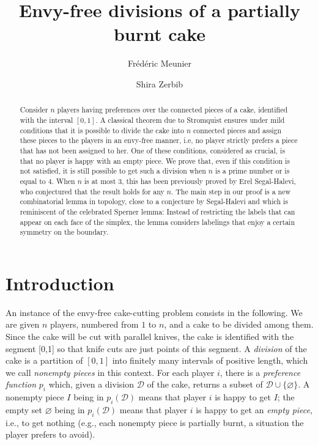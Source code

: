 \documentclass[12pt]{amsart}
\theoremstyle{definition}
\theoremstyle{remark}
\def\D{\mathcal{D}}
\begin{document}
 

\title{Envy-free divisions of a partially burnt cake}

\author{Fr\'ed\'eric Meunier}
\address{F. Meunier, Universit\'e Paris Est, CERMICS, 77455 Marne-la-Vall\'ee CEDEX, France}

\author{Shira Zerbib}
\address{S. Zerbib, Dept. Math., University of Michigan, Ann Arbor, MI}


\begin{abstract}
Consider $n$ players having preferences over the connected pieces of a cake, identified with the interval $[0,1]$. A classical theorem due to Stromquist ensures under mild conditions that it is possible to divide the cake into $n$ connected pieces and assign these pieces to the players in an envy-free manner, i.e, no player strictly prefers a piece that has not been assigned to her. One of these conditions, considered as crucial, is that no player is happy with an empty piece. We prove that, even if this condition is not satisfied, it is still possible to get such a division when $n$ is a prime number or is equal to $4$. When $n$ is at most $3$, this has been previously proved by Erel Segal-Halevi, who conjectured that the result holds for any $n$. The main step in our proof is a new combinatorial lemma in topology, close to a conjecture by Segal-Halevi and which is reminiscent of the celebrated Sperner lemma: Instead of restricting the labels that can appear on each face of the simplex, the lemma considers labelings that enjoy a certain symmetry on the boundary.
\end{abstract}


\maketitle 

\section{Introduction}

An instance of the envy-free cake-cutting problem consists in the following. We are given $n$ players, numbered from $1$ to $n$, and a cake to be divided among them. Since the cake will be cut with parallel knives, the cake is identified with the segment [0,1] so that knife cuts are just points of this segment.  A {\em division} of the cake is a partition of $[0,1]$ into finitely many intervals of positive length, which we call {\em nonempty pieces} in this context.
For each player $i$, there is a {\em preference function} $p_i$ which, given a division $\D$ of the cake, returns a subset of $\D\cup\{\varnothing\}$. A nonempty piece $I$ being in $p_i(\D)$ means that player $i$ is happy to get $I$; the empty set $\varnothing$ being in $p_i(\D)$ means that player $i$ is happy to get an {\em empty piece}, i.e., to get nothing (e.g., each nonempty piece is partially burnt, a situation the player prefers to avoid).
\end{document}
